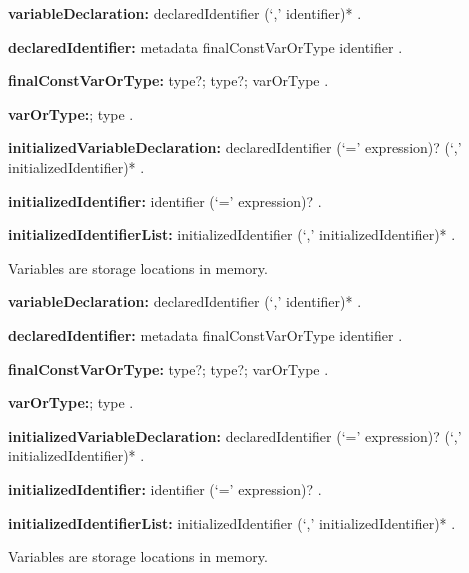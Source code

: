 \documentclass{article}
\begin{document}
\begin{grammar}
{\bf variableDeclaration:}
      declaredIdentifier (`,' identifier)*
      .

{\bf declaredIdentifier:}
      metadata finalConstVarOrType identifier
    .

{\bf finalConstVarOrType:}\FINAL{} type?;
           \CONST{} type?;
	varOrType
    .

 {\bf varOrType:}\VAR{};
	type
    .



 {\bf initializedVariableDeclaration:}
      declaredIdentifier (`=' expression)? (`,' initializedIdentifier)* %
    .

{\bf initializedIdentifier:}
      identifier (`=' expression)? %
    .

{\bf initializedIdentifierList:}
      initializedIdentifier (`,' initializedIdentifier)*
    .




  \end{grammar}

\LMHash{}
Variables are storage locations in memory.

\begin{grammar}
{\bf variableDeclaration:}
      declaredIdentifier (`,' identifier)*
      .

{\bf declaredIdentifier:}
      metadata finalConstVarOrType identifier
    .

{\bf finalConstVarOrType:}\FINAL{} type?;
           \CONST{} type?;
	varOrType
    .

 {\bf varOrType:}\VAR{};
	type
    .

 {\bf initializedVariableDeclaration:}
      declaredIdentifier (`=' expression)? (`,' initializedIdentifier)* %
    .

{\bf initializedIdentifier:}
      identifier (`=' expression)? %
    .

{\bf initializedIdentifierList:}
      initializedIdentifier (`,' initializedIdentifier)*
    .




  \end{grammar}

\LMHash{}
Variables are storage locations in memory.
\end{document}
